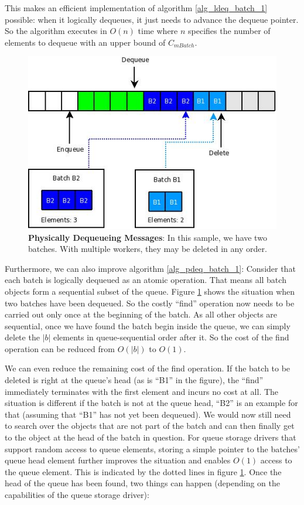 \documentclass[a4paper,10pt]{article}
\begin{document}
This makes an efficient implementation of algorithm \ref{alg_ldeq_batch_1} possible: when it logically dequeues, it just needs to advance the dequeue pointer. So the algorithm executes in $O(n)$ time where $n$ specifies the number of elements to dequeue with an upper bound of $C_{mBatch}$.

\begin{figure}[h]
\begin{center}
\includegraphics[scale=0.6]{rsyslog_queue_pointers2.jpeg}
\end{center}
\caption{\textbf{Physically Dequeueing Messages}: In this sample, we have two batches. With multiple workers, they may be deleted in any order.}
\label{fig_queue_ptr_deq}
\end{figure}

Furthermore, we can also improve algorithm \ref{alg_pdeq_batch_1}: Consider that each batch is logically dequeued as an atomic operation. That means all batch objects form a sequential subset of the queue. Figure \ref{fig_queue_ptr_deq} shows the situation when two batches have been dequeued.  So the costly ``find'' operation now needs to be carried out only once at the beginning of the batch. As all other objects are sequential, once we have found the batch begin inside the queue, we can simply delete the $|b|$ elements in queue-sequential order after it. So the cost of the find operation can be reduced from $O(|b|)$ to $O(1)$.

We can even reduce the remaining cost of the find operation. If the batch to be deleted is right at the queue's head (as is ``B1'' in the figure), the ``find'' immediately terminates with the first element and incurs no cost at all. The situation is different if the batch is not at the queue head, ``B2'' is an example for that (assuming that ``B1'' has not yet been dequeued). We would now still need to search over the objects that are not part of the batch and can then finally get to the object at the head of the batch in question. For queue storage drivers that support random access to queue elements, storing a simple pointer to the batches' queue head element further improves the situation and enables $O(1)$ access to the queue element. This is indicated by the dotted lines in figure \ref{fig_queue_ptr_deq}. Once the head of the queue has been found, two things can happen (depending on the capabilities of the queue storage driver):
\end{document}
